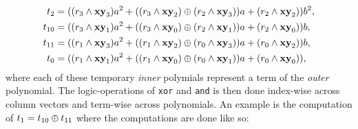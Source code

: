 \begin{equation*}
    \begin{split}
        t_2 &= ((r_3 \wedge \textbf{xy}_3)a^2 + ((r_3 \wedge \textbf{xy}_2) \oplus (r_2 \wedge \textbf{xy}_3))a + (r_2 \wedge \textbf{xy}_2))b^2,\\
        t_{10} &= ((r_3 \wedge \textbf{xy}_1)a^2 + ((r_3 \wedge \textbf{xy}_0) \oplus (r_2 \wedge \textbf{xy}_1))a + (r_2 \wedge \textbf{xy}_0))b,\\
        t_{11} &= ((r_1 \wedge \textbf{xy}_3)a^2 + ((r_1 \wedge \textbf{xy}_2) \oplus (r_0 \wedge \textbf{xy}_3))a + (r_0 \wedge \textbf{xy}_2))b,\\
        t_0 &= ((r_1 \wedge \textbf{xy}_1)a^2 + ((r_1 \wedge \textbf{xy}_0) \oplus (r_0 \wedge \textbf{xy}_1))a + (r_0 \wedge \textbf{xy}_0)),
    \end{split}
\end{equation*}
where each of these temporary \textit{inner} polymials represent a term of the \textit{outer} polynomial. The logic-operations of \texttt{xor} and \texttt{and} is then done index-wise across column vectors and term-wise across polynomials. An example is the computation of $t_1 = t_{10} \oplus t_{11}$ where the computations are done like so:
